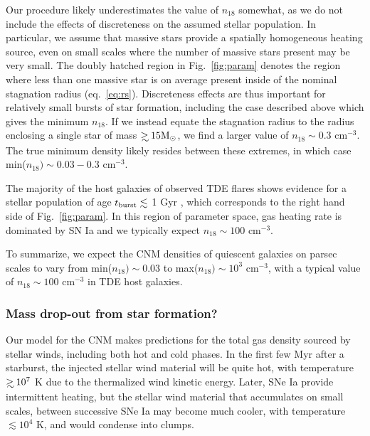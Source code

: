 \documentclass[usenatbib,fleqn]{mnras}
\newcommand\gsim{\mathrel{\rlap{\lower4pt\hbox{\hskip1pt$\sim$}}
    \raise1pt\hbox{$>$}}}
\newcommand{\Msun}{{\rm M_\odot}}
\begin{document}
Our procedure likely underestimates the value of $n_{18}$ somewhat, as we do not include the effects of discreteness on the assumed stellar population.  In particular, we assume that massive stars provide a spatially homogeneous heating source, even on small scales where the number of massive stars present may be very small.  The doubly hatched region in Fig.~\ref{fig:param} denotes the region where less than one massive star is on average present inside of the nominal stagnation radius (eq.~\ref{eq:rs}).  Discreteness effects are thus important for relatively small bursts of star formation, including the case described above which gives the minimum $n_{18}$.  If we instead equate the stagnation radius to the radius enclosing a single star of mass $\gsim 15 \Msun$, we find a larger value of $n_{18}\sim 0.3$ cm$^{-3}$.  The true minimum density likely resides between these extremes, in which case min($n_{18}) \sim 0.03-0.3$ cm$^{-3}$.

The majority of the host galaxies of observed TDE flares shows evidence for a stellar population of age $t_{\rm burst} \lesssim$ 1 Gyr \citep{French+2016}, which corresponds to the right hand side of Fig.~\ref{fig:param}. In this region of parameter space, gas heating rate is dominated by SN Ia and we typically expect $n_{18}\sim 100$ cm$^{-3}$.

To summarize, we expect the CNM densities of quiescent galaxies on parsec scales to vary from min($n_18) \sim 0.03$ to max($n_{18})\sim 10^{3}$ cm$^{-3}$, with a typical value of $n_{18}\sim 100$ cm$^{-3}$ in TDE host galaxies.  

\subsubsection{Mass drop-out from star formation?}

Our model for the CNM makes predictions for the total gas density sourced by stellar winds, including both hot and cold phases.  In the first few Myr after a starburst, the injected stellar wind material will be quite hot, with temperature $\gsim 10^{7}$ K due to the thermalized wind kinetic energy.  Later, SNe Ia provide intermittent heating, but the stellar wind material that accumulates on small scales, between successive SNe Ia may become much cooler, with temperature $\lesssim 10^{4}$ K, and would condense into clumps. 
\end{document}
